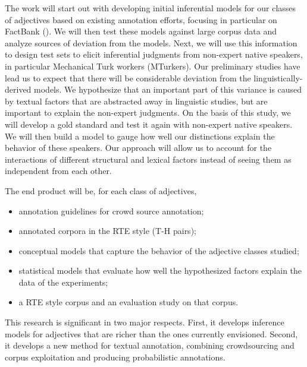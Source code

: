 \documentclass[10pt]{article}
\newcommand{\moveup}{\vspace*{-1.8mm}}
\begin{document}
The work will start out with developing initial inferential models for our classes of adjectives based on existing annotation efforts, focusing in particular on FactBank (\cite{factbank:2009}).
We will then test these models against large corpus data and analyze sources of deviation from the models. Next, we will use this information to design test sets to elicit inferential judgments from non-expert native speakers, in particular Mechanical Turk workers (MTurkers). Our preliminary studies have lead us to expect that there will be considerable deviation from the linguistically-derived models. We hypothesize that an important part of this variance is caused by textual factors that are abstracted away in linguistic studies, but are important to explain the non-expert judgments. On the basis of this study, we will develop a gold standard and test it again with non-expert native speakers. We will then build a model to gauge how well our distinctions explain the behavior of these speakers. Our approach will allow us to account for the interactions of different structural and lexical factors instead of seeing them as independent from each other. 

The end product will be, for each class of adjectives,
\begin{itemize}
\moveup
\item annotation guidelines for crowd source annotation;
\moveup
\item annotated corpora in the RTE style (T-H pairs);
\moveup
\item conceptual models that capture the behavior of the adjective classes studied;
\moveup
\item statistical models that evaluate how well the hypothesized factors explain the data of the experiments;
\moveup
\moveup
\moveup
\item a RTE style corpus and an evaluation study on that corpus.
\moveup
\end{itemize} 

This research is significant in two major respects. First, it develops inference models for adjectives that are richer than the ones currently envisioned. Second, it develops a new method for textual annotation, combining crowdsourcing and corpus exploitation and producing probabilistic annotations.
\end{document}

